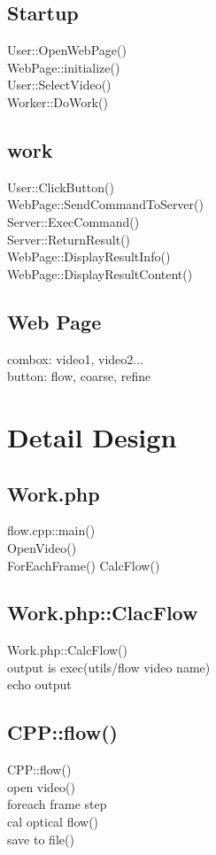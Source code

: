 \documentclass{article}
\begin{document}
\subsection{Startup}

User::OpenWebPage()\\
\indent WebPage::initialize()\\
\indent User::SelectVideo()\\
\indent Worker::DoWork()

\subsection{work}
User::ClickButton()\\
\indent WebPage::SendCommandToServer()\\
\indent Server::ExecCommand()\\
\indent Server::ReturnResult()\\
\indent \indent WebPage::DisplayResultInfo()\\
\indent \indent WebPage::DisplayResultContent()

\subsection{Web Page}

combox: video1, video2...\\
button: flow, coarse, refine

\section{Detail Design}

\subsection{Work.php}
flow.cpp::main()\\
\indent OpenVideo()\\
\indent ForEachFrame()
\indent CalcFlow()

\subsection{Work.php::ClacFlow}
Work.php::CalcFlow()\\
\indent output is exec(utils/flow video name)\\
\indent echo output



\subsection{CPP::flow()}
CPP::flow()\\
\indent open video()\\
\indent foreach frame step\\
\indent \indent cal optical flow()\\
\indent \indent save to file()
\end{document}
